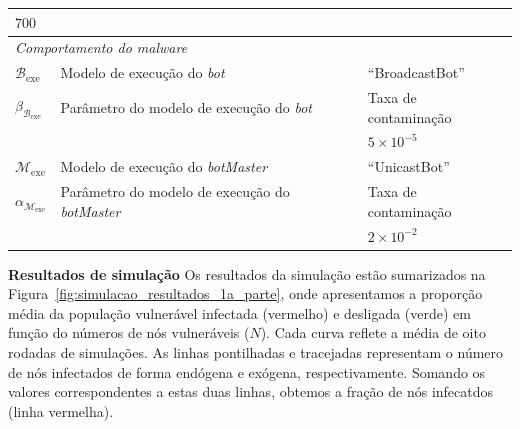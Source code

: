 \begin{table}[!htb]
\begin{tabular}{lll}
	        $700$ \\
	        \hline
	        \hline
	        \multicolumn{3}{l}{\emph{Comportamento do malware}} \\
	        $\mathcal{B}_\mathrm{exe}$ & 
	        Modelo de execução do \textit{bot} & ``BroadcastBot'' \\
	        \hline
	        $\beta_{\mathcal{B}_\mathrm{exe}}$ & 
	        Parâmetro do modelo de execução do \textit{bot} &
	        Taxa de contaminação\\
	        & & $5\times10^{-5}$ \\
	        \hline
	        $\mathcal{M}_\mathrm{exe}$ & 
	        Modelo de execução do \textit{botMaster} &
	        ``UnicastBot'' \\
	        \hline
	        $\alpha_{\mathcal{M}_\mathrm{exe}}$ & 
	        Parâmetro do modelo de execução do \textit{botMaster} & 
	        Taxa de contaminação\\
	        & & $2\times10^{-2}$ \\
	        \hline
	        \hline
	\end{tabular}
	\label{tab:sim.params}
	\end{table}


	\textbf{Resultados de simulação}  
	    Os  resultados da simulação estão sumarizados na Figura~\ref{fig:simulacao_resultados_1a_parte}, onde apresentamos a proporção média da população vulnerável  infectada (vermelho) e desligada (verde)  em função do números de nós vulneráveis ($N$).  Cada curva reflete a média de  oito  rodadas de simulações.  As linhas pontilhadas e tracejadas representam o número de nós infectados de forma endógena e exógena, respectivamente.  Somando os valores correspondentes a estas duas linhas, obtemos a fração de nós infecatdos (linha vermelha). 
	    

	    
	    
